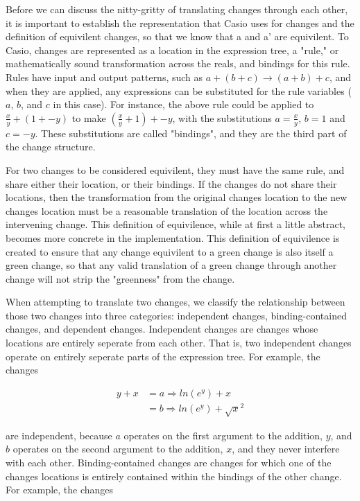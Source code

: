 \documentclass{article}
\newcommand{\insetarrow}[1]{=#1\Rightarrow}
\newcommand{\lnexp}[1]{ln\left(e^{#1}\right)}
\begin{document}
Before we can discuss the nitty-gritty of translating changes through each other, 
it is important to establish the representation that Casio uses for changes 
and the definition of equivilent changes, 
so that we know that a and a' are equivilent. 
To Casio, changes are represented as a location in the expression tree, 
a "rule," or mathematically sound transformation across the reals, 
and bindings for this rule. 
Rules have input and output patterns, 
such as $a + (b + c) \to (a + b) + c$,
and when they are applied, 
any expressions can be substituted for the rule variables 
($a$, $b$, and $c$ in this case). 
For instance, 
the above rule could be applied 
to $\frac{x}{y} + (1 + -y)$ 
to make $(\frac{x}{y} + 1) + -y$, 
with the substitutions $a = \frac{x}{y}$, $b = 1$ and $c = -y$. 
These substitutions are called "bindings", 
and they are the third part of the change structure.

For two changes to be considered equivilent, 
they must have the same rule, 
and share either their location, 
or their bindings. 
If the changes do not share their locations, 
then the transformation from the original changes location 
to the new changes location must be a reasonable translation 
of the location across the intervening change. 
This definition of equivilence, 
while at first a little abstract, 
becomes more concrete in the implementation. 
This definition of equivilence is created to ensure 
that any change equivilent to a green change 
is also itself a green change, 
so that any valid translation of a green change 
through another change 
will not strip the "greenness" from the change.

When attempting to translate two changes, 
we classify the relationship between those two changes 
into three categories: 
independent changes, 
binding-contained changes, 
and dependent changes. 
Independent changes are changes whose locations 
are entirely seperate from each other. 
That is, 
two independent changes operate 
on entirely seperate parts 
of the expression tree. 
For example, 
the changes 

\begin{align*}
y + x &\insetarrow{a} \lnexp{y} + x \\
&\insetarrow{b} \lnexp{y} + \sqrt{x}^2
\end{align*}

are independent, 
because $a$ operates 
on the first argument to the addition, 
$y$, 
and $b$ operates 
on the second argument to the addition, 
$x$, 
and they never interfere with each other. 
Binding-contained changes are changes 
for which one of the changes locations 
is entirely contained within the bindings of the other change. 
For example, 
the changes 
\end{document}
